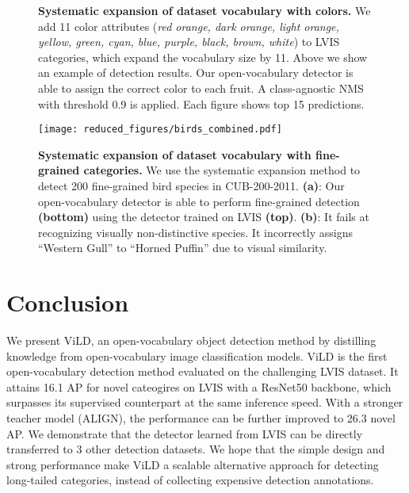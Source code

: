 \documentclass{article} \usepackage{iclr2022_conference,times}
\begin{document}
\begin{figure}[t!]
\centering
    \vspace{-1.5ex}
    \caption{\textbf{Systematic expansion of dataset vocabulary with colors.} We add 11 color attributes (\textit{red orange, dark orange, light orange, yellow, green, cyan, blue, purple, black, brown, white}) to LVIS categories, which expand the vocabulary size by 11. Above we show an example of detection results. Our open-vocabulary detector is able to assign the correct color to each fruit. A class-agnostic NMS with threshold 0.9 is applied. Each figure shows top 15 predictions. }\label{fig:cond_prob}
    \vspace{1ex}
\end{figure}

\begin{figure}
\centering
    \texttt{[image: reduced\_figures/birds\_combined.pdf]}
    \vspace{-1.5ex}
    \caption{\textbf{Systematic expansion of dataset vocabulary with fine-grained categories.} 
    We use the systematic expansion method to detect 200 fine-grained bird species in CUB-200-2011. \textbf{(a)}: Our open-vocabulary detector is able to perform fine-grained detection \textbf{(bottom)} using the detector trained on LVIS \textbf{(top)}. \textbf{(b)}: It fails at recognizing visually non-distinctive species. It incorrectly assigns ``Western Gull'' to ``Horned Puffin'' due to visual similarity.}
    \label{fig:fg_bird_good}
    \vspace{-1ex}
\end{figure}

\section{Conclusion}
We present ViLD, an open-vocabulary object detection method by distilling knowledge from open-vocabulary image classification models. ViLD is the first open-vocabulary detection method evaluated on the challenging LVIS dataset. It attains 16.1 AP for novel cateogires on LVIS with a ResNet50 backbone, which surpasses its supervised counterpart at the same inference speed. With a stronger teacher model (ALIGN), the performance can be further improved to 26.3 novel AP. We demonstrate that the detector learned from LVIS can be directly transferred to 3 other detection datasets.
We hope that the simple design and strong performance make ViLD a scalable alternative approach for detecting long-tailed categories, instead of collecting expensive detection annotations.
\end{document}
